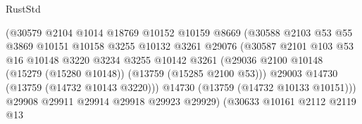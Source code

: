 \begin{lexlean}{RustStd}
\begin{coremodule}
                                        (@30579
                                          @2104
                                          @1014
                                          @18769
                                          @10152
                                          @10159
                                          @8669
                                          (@30588
                                            @2103
                                            @53
                                            @55
                                            @3869
                                            @10151
                                            @10158
                                            @3255
                                            @10132
                                            @3261
                                            @29076
                                            (@30587
                                              @2101
                                              @103
                                              @53
                                              @16
                                              @10148
                                              @3220
                                              @3234
                                              @3255
                                              @10142
                                              @3261
                                              (@29036
                                                @2100
                                                @10148
                                                (@15279 (@15280 @10148))
                                                (@13759 (@15285 @2100 @53)))
                                              @29003
                                              @14730
                                              (@13759 (@14732 @10143 @3220)))
                                            @14730
                                            (@13759 (@14732 @10133 @10151)))
                                          @29908
                                          @29911
                                          @29914
                                          @29918
                                          @29923
                                          @29929)
                                        (@30633
                                          @10161
                                          @2112
                                          @2119
                                          @13

\end{coremodule}
\end{lexlean}
